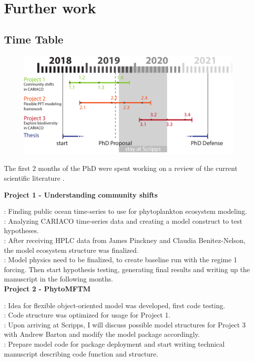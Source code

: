 \chapter {Further work}

\section{Time Table}

\begin{figure}[h]
\centering
\includegraphics[trim = 0mm 0mm 0mm 0mm, clip, width=1.1\linewidth]{./Chp3-Further/TimePlanAsset1.pdf}

\end{figure}


The first 2 months of the PhD were spent working on a review of the current scientific literature .

{\bf{Project 1 - Understanding community shifts}}

: Finding public ocean time-series to use for phytoplankton ecosystem modeling.\\
: Analyzing CARIACO time-series data and creating a model construct to test hypotheses.\\
: After receiving HPLC data from James Pinckney and Claudia Benitez-Nelson, the model ecosystem structure was finalized. \\
: Model physics need to be finalized, to create baseline run with the regime 1 forcing. Then start hypothesis testing, generating final results and writing up the manuscript in the following months. \\


{\bf{Project 2 - PhytoMFTM}}

: Idea for flexible object-oriented model was developed, first code testing.\\
: Code structure was optimized for usage for Project 1.\\
: Upon arriving at Scripps, I will discuss possible model structures for Project 3 with Andrew Barton and modify the model package accordingly. \\
: Prepare model code for package deployment and start writing technical manuscript describing code function and structure. \\


